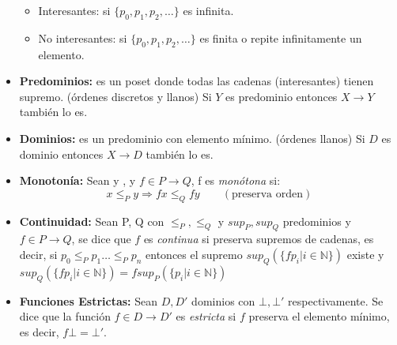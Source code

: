 \begin{itemize}
      \begin{itemize}
        \item Interesantes: si $\{p_0, p_1, p_2, \dotsc\}$ es infinita.
        \item No interesantes: si $\{p_0, p_1, p_2, \dotsc\}$ es finita o repite infinitamente un elemento.
      \end{itemize}
    \item \textbf{Predominios:} es un poset donde todas las cadenas (interesantes) tienen supremo. (órdenes discretos y llanos)
      \PN Si $Y$ es predominio entonces $X \rightarrow Y$ también lo es.
    \item \textbf{Dominios:} es un predominio con elemento mínimo. (órdenes llanos)
      \PN Si $D$ es dominio entonces $X \rightarrow D$ también lo es.
    \item \textbf{Monotonía:} Sean  y , y $f \in P \rightarrow Q$, f es \textit{monótona} si:
      \[
        x \leq_P y \Rightarrow f x \leq_Q f y \qquad (\text{preserva orden})
      \]
    \item \textbf{Continuidad:} Sean P, Q con $\leq_P, \leq_Q$ y $sup_P, sup_Q$ predominios y $f \in P \rightarrow Q$, se dice que $f$ es \textit{continua} si preserva supremos de cadenas, es decir, si $p_0 \leq_P p_1 \dotsc \leq_P p_n$ entonces el supremo $sup_Q(\{f p_i | i \in \mathbb{N}\})$ existe y $sup_Q(\{f p_i | i \in \mathbb{N}\}) = f sup_P(\{p_i | i \in \mathbb{N}\})$
    \item \textbf{Funciones Estrictas:} Sean $D, D'$ dominios con $\bot, \bot'$ respectivamente. Se dice que la función $f \in D \rightarrow D'$ es \textit{estricta} si $f$ preserva el elemento mínimo, es decir, $f \bot = \bot'$.
  \end{itemize}

